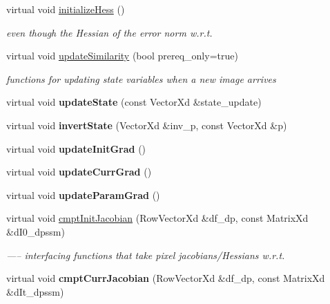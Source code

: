 \begin{DoxyCompactItemize}
\item 
virtual void \hyperlink{classAppearanceModel_afb47df1d5e8a74f41ac70af3612180d2}{initialize\-Hess} ()
\begin{DoxyCompactList}\small\item\em even though the Hessian of the error norm w.\-r.\-t. \end{DoxyCompactList}\item 
virtual void \hyperlink{classAppearanceModel_a06136ecd903e85ed2007da2c7b12bd58}{update\-Similarity} (bool prereq\-\_\-only=true)
\begin{DoxyCompactList}\small\item\em functions for updating state variables when a new image arrives \end{DoxyCompactList}\item 
\hypertarget{classAppearanceModel_a184dafcec26de15236550a9011fb93f9}{virtual void {\bfseries update\-State} (const Vector\-Xd \&state\-\_\-update)}\label{classAppearanceModel_a184dafcec26de15236550a9011fb93f9}

\item 
\hypertarget{classAppearanceModel_a5442374c0c95d4649cf1f9234f23e422}{virtual void {\bfseries invert\-State} (Vector\-Xd \&inv\-\_\-p, const Vector\-Xd \&p)}\label{classAppearanceModel_a5442374c0c95d4649cf1f9234f23e422}

\item 
\hypertarget{classAppearanceModel_a5ad5890e5978a0025300acacddb0d97f}{virtual void {\bfseries update\-Init\-Grad} ()}\label{classAppearanceModel_a5ad5890e5978a0025300acacddb0d97f}

\item 
\hypertarget{classAppearanceModel_ae5e2601d32475be3001b77b02108845b}{virtual void {\bfseries update\-Curr\-Grad} ()}\label{classAppearanceModel_ae5e2601d32475be3001b77b02108845b}

\item 
\hypertarget{classAppearanceModel_a292b85c011140c14e81dd8f1a30933d6}{virtual void {\bfseries update\-Param\-Grad} ()}\label{classAppearanceModel_a292b85c011140c14e81dd8f1a30933d6}

\item 
virtual void \hyperlink{classAppearanceModel_a8f3a4e961bc1a5c9acd64bf3b376f859}{cmpt\-Init\-Jacobian} (Row\-Vector\-Xd \&df\-\_\-dp, const Matrix\-Xd \&d\-I0\-\_\-dpssm)
\begin{DoxyCompactList}\small\item\em ----- interfacing functions that take pixel jacobians/\-Hessians w.\-r.\-t. \end{DoxyCompactList}\item 
\hypertarget{classAppearanceModel_a2ab29cd5820e12cb0b01f1bf99210b8d}{virtual void {\bfseries cmpt\-Curr\-Jacobian} (Row\-Vector\-Xd \&df\-\_\-dp, const Matrix\-Xd \&d\-It\-\_\-dpssm)}\label{classAppearanceModel_a2ab29cd5820e12cb0b01f1bf99210b8d}


\end{DoxyCompactItemize}
